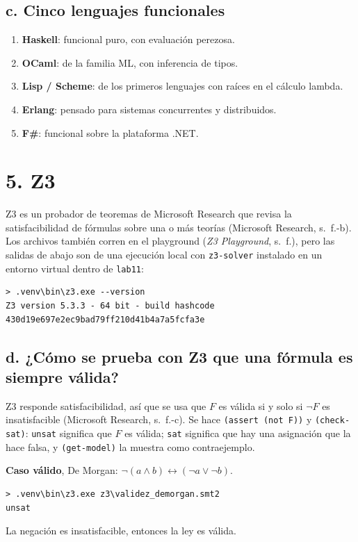 \documentclass[11pt,letterpaper]{article}
\begin{document}
\subsection*{c. Cinco lenguajes funcionales}

\begin{enumerate}[nosep]
  \item \textbf{Haskell}: funcional puro, con evaluación perezosa.
  \item \textbf{OCaml}: de la familia ML, con inferencia de tipos.
  \item \textbf{Lisp / Scheme}: de los primeros lenguajes con raíces en el cálculo lambda.
  \item \textbf{Erlang}: pensado para sistemas concurrentes y distribuidos.
  \item \textbf{F\#}: funcional sobre la plataforma .NET.
\end{enumerate}

\section*{5. Z3}

Z3 es un probador de teoremas de Microsoft Research que revisa la satisfacibilidad de fórmulas sobre una o más teorías (Microsoft Research, s.~f.-b). Los archivos también corren en el playground (\emph{Z3 Playground}, s.~f.), pero las salidas de abajo son de una ejecución local con \texttt{z3-solver} instalado en un entorno virtual dentro de \texttt{lab11}:
\begin{lstlisting}[basicstyle=\ttfamily\footnotesize]
> .venv\bin\z3.exe --version
Z3 version 5.3.3 - 64 bit - build hashcode 430d19e697e2ec9bad79ff210d41b4a7a5fcfa3e
\end{lstlisting}

\subsection*{d. ¿Cómo se prueba con Z3 que una fórmula es siempre válida?}

Z3 responde satisfacibilidad, así que se usa que $F$ es válida si y solo si $\neg F$ es insatisfacible (Microsoft Research, s.~f.-c). Se hace \texttt{(assert (not F))} y \texttt{(check-sat)}: \texttt{unsat} significa que $F$ es válida; \texttt{sat} significa que hay una asignación que la hace falsa, y \texttt{(get-model)} la muestra como contraejemplo.

\textbf{Caso válido}, De Morgan: $\neg(a \wedge b) \leftrightarrow (\neg a \vee \neg b)$.

\begin{lstlisting}
> .venv\bin\z3.exe z3\validez_demorgan.smt2
unsat
\end{lstlisting}
La negación es insatisfacible, entonces la ley es válida.
\end{document}
